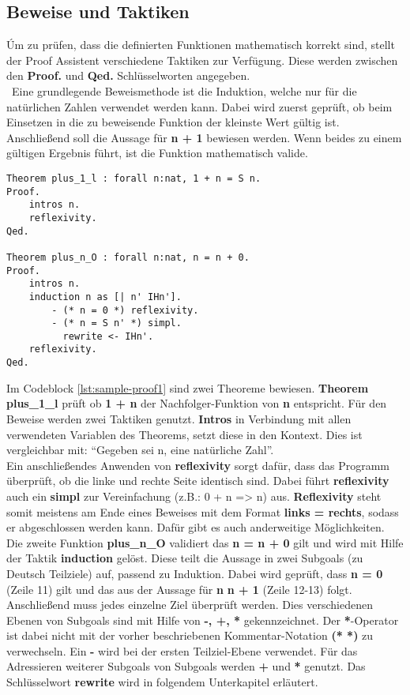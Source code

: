 \subsection{Beweise und Taktiken}
Úm zu prüfen, dass die definierten Funktionen mathematisch korrekt sind, stellt der Proof Assistent verschiedene Taktiken zur Verfügung. Diese werden zwischen den \textbf{Proof.} und \textbf{Qed.} Schlüsselworten angegeben.\\\
Eine grundlegende Beweismethode ist die Induktion, welche nur für die natürlichen Zahlen verwendet werden kann. Dabei wird zuerst geprüft, ob beim Einsetzen in die zu beweisende Funktion der kleinste Wert gültig ist. Anschließend soll die Aussage für \textbf{n + 1} bewiesen werden. Wenn beides zu einem gültigen Ergebnis führt, ist die Funktion mathematisch valide.
\begin{lstlisting}[language=coq,firstnumber=1,caption=Coq Beispielbeweis,label=lst:sample-proof1]
Theorem plus_1_l : forall n:nat, 1 + n = S n.
Proof.
	intros n. 
	reflexivity. 
Qed.

Theorem plus_n_O : forall n:nat, n = n + 0.
Proof.
	intros n. 
	induction n as [| n' IHn'].
		- (* n = 0 *) reflexivity.
		- (* n = S n' *) simpl.
		  rewrite <- IHn'.
	reflexivity.
Qed.
\end{lstlisting}
Im Codeblock \ref{lst:sample-proof1} sind zwei Theoreme bewiesen. \textbf{Theorem plus\_1\_l} prüft ob \textbf{1 + n} der Nachfolger-Funktion von \textbf{n} entspricht.
Für den Beweise werden zwei Taktiken genutzt. \textbf{Intros} in Verbindung mit allen verwendeten Variablen des Theorems, setzt diese in den Kontext. Dies ist vergleichbar mit: "`Gegeben sei n, eine natürliche Zahl"'.\\
Ein anschließendes Anwenden von \textbf{reflexivity} sorgt dafür, dass das Programm überprüft, ob die linke und rechte Seite identisch sind. Dabei führt \textbf{reflexivity} auch ein \textbf{simpl} zur Vereinfachung (z.B.: 0 + n => n) aus. \textbf{Reflexivity} steht somit meistens am Ende eines Beweises mit dem Format \textbf{links = rechts}, sodass er abgeschlossen werden kann. Dafür gibt es auch anderweitige Möglichkeiten.\\
Die zweite Funktion \textbf{plus\_n\_O} validiert das \textbf{n = n + 0} gilt und wird mit Hilfe der Taktik \textbf{induction} gelöst. Diese teilt die Aussage in zwei Subgoals (zu Deutsch Teilziele) auf, passend zu Induktion. Dabei wird geprüft, dass \textbf{n = 0} (Zeile 11) gilt und das aus der Aussage für \textbf{n} \textbf{n + 1} (Zeile 12-13) folgt.
Anschließend muss jedes einzelne Ziel überprüft werden. Dies verschiedenen Ebenen von Subgoals sind mit Hilfe von \textbf{-, +, *} gekennzeichnet. Der \textbf{*}-Operator ist dabei nicht mit der vorher beschriebenen Kommentar-Notation \textbf{(* *)} zu verwechseln. Ein \textbf{-} wird bei der ersten Teilziel-Ebene verwendet. Für das Adressieren weiterer Subgoals von Subgoals werden \textbf{+} und \textbf{*} genutzt. Das Schlüsselwort \textbf{rewrite} wird in folgendem Unterkapitel erläutert.

